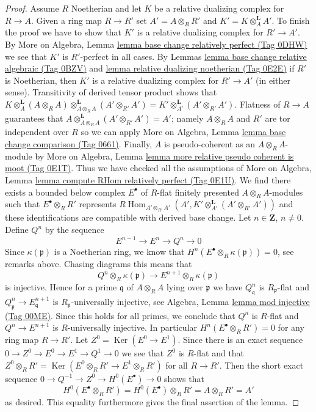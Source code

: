 \documentclass{amsart}
\theoremstyle{plain}
\theoremstyle{definition}
\theoremstyle{remark}
\numberwithin{equation}{subsection}
\def\Hom{\mathop{\mathrm{Hom}}\nolimits}
\def\Ker{\mathop{\mathrm{Ker}}}
\begin{document}
\begin{proof}
\medskip\noindent
Assume $R$ Noetherian and let $K$ be a relative dualizing complex
for $R \to A$. Given a ring map $R \to R'$ set $A' = A \otimes_R R'$
and $K' = K \otimes_A^\mathbf{L} A'$. To finish the proof we have
to show that $K'$ is a relative dualizing complex for $R' \to A'$.
By More on Algebra, Lemma
\href{https://stacks.math.columbia.edu/tag/0DHW}{lemma base change relatively perfect (Tag 0DHW)}
we see that $K'$ is $R'$-perfect in all cases.
By Lemmas \href{https://stacks.math.columbia.edu/tag/0BZV}{lemma base change relative algebraic (Tag 0BZV)} and
\href{https://stacks.math.columbia.edu/tag/0E2E}{lemma relative dualizing noetherian (Tag 0E2E)}
if $R'$ is Noetherian, then $K'$ is a relative dualizing complex
for $R' \to A'$ (in either sense).
Transitivity of derived tensor product shows that
$K \otimes_A^\mathbf{L} (A \otimes_R A)
\otimes_{A \otimes_R A}^\mathbf{L} (A' \otimes_{R'} A') =
K' \otimes_{A'}^\mathbf{L} (A' \otimes_{R'} A')$.
Flatness of $R \to A$ guarantees that
$A \otimes_{A \otimes_R A}^\mathbf{L} (A' \otimes_{R'} A') = A'$;
namely $A \otimes_R A$ and $R'$ are tor independent over $R$
so we can apply More on Algebra, Lemma
\href{https://stacks.math.columbia.edu/tag/0661}{lemma base change comparison (Tag 0661)}.
Finally, $A$ is pseudo-coherent as an $A \otimes_R A$-module
by More on Algebra, Lemma
\href{https://stacks.math.columbia.edu/tag/0E1T}{lemma more relative pseudo coherent is moot (Tag 0E1T)}. Thus
we have checked all the assumptions of
More on Algebra, Lemma
\href{https://stacks.math.columbia.edu/tag/0E1U}{lemma compute RHom relatively perfect (Tag 0E1U)}.
We find there exists a bounded below complex
$E^\bullet$ of $R$-flat finitely presented $A \otimes_R A$-modules
such that $E^\bullet \otimes_R R'$ represents
$R\Hom_{A' \otimes_{R'} A'}(A',
K' \otimes_{A'}^\mathbf{L} (A' \otimes_{R'} A'))$
and these identifications are compatible with derived base change.
Let $n \in \mathbf{Z}$, $n \not = 0$.
Define $Q^n$ by the sequence
$$
E^{n - 1} \to E^n \to Q^n \to 0
$$
Since $\kappa(\mathfrak p)$ is a Noetherian ring, we know that
$H^n(E^\bullet \otimes_R \kappa(\mathfrak p)) = 0$, see remarks above.
Chasing diagrams this means that
$$
Q^n \otimes_R \kappa(\mathfrak p) \to E^{n + 1} \otimes_R \kappa(\mathfrak p)
$$
is injective. Hence for a prime $\mathfrak q$ of $A \otimes_R A$
lying over $\mathfrak p$ we have $Q^n_\mathfrak q$ is $R_\mathfrak p$-flat
and $Q^n_\mathfrak p \to E^{n + 1}_\mathfrak q$ is
$R_\mathfrak p$-universally injective, see
Algebra, Lemma \href{https://stacks.math.columbia.edu/tag/00ME}{lemma mod injective (Tag 00ME)}.
Since this holds for all primes,
we conclude that $Q^n$ is $R$-flat
and $Q^n \to E^{n + 1}$ is $R$-universally injective. In particular
$H^n(E^\bullet \otimes_R R') = 0$ for any ring map $R \to R'$.
Let $Z^0 = \Ker(E^0 \to E^1)$. Since there is an exact sequence
$0 \to Z^0 \to E^0 \to E^1 \to Q^1 \to 0$ we see that $Z^0$
is $R$-flat and that
$Z^0 \otimes_R R' = \Ker(E^0 \otimes_R R' \to E^1 \otimes_R R')$
for all $R \to R'$. Then the short exact sequence
$0 \to Q^{-1} \to Z^0 \to H^0(E^\bullet) \to 0$
shows that
$$
H^0(E^\bullet \otimes_R R') = H^0(E^\bullet) \otimes_R R'
= A \otimes_R R' = A'
$$
as desired. This equality furthermore gives the final assertion
of the lemma.
\end{proof}
\end{document}
